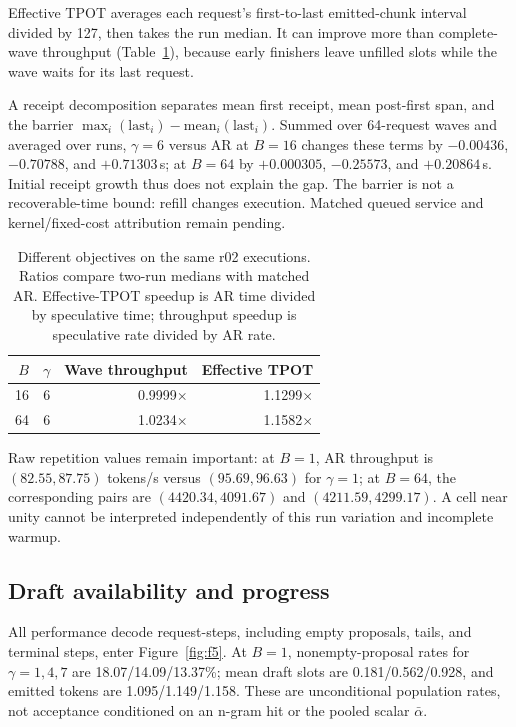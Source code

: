 \documentclass[conference,letterpaper]{IEEEtran}
\begin{document}
Effective TPOT averages each request's first-to-last emitted-chunk interval divided by 127, then takes the run median. It can improve more than complete-wave throughput (Table~\ref{tab:objectives}), because early finishers leave unfilled slots while the wave waits for its last request.

A receipt decomposition separates mean first receipt, mean post-first span, and the barrier $\max_i(\mathrm{last}_i)-\mathrm{mean}_i(\mathrm{last}_i)$. Summed over 64-request waves and averaged over runs, $\gamma=6$ versus AR at $B=16$ changes these terms by $-0.00436$, $-0.70788$, and $+0.71303$\,s; at $B=64$ by $+0.000305$, $-0.25573$, and $+0.20864$\,s. Initial receipt growth thus does not explain the gap. The barrier is not a recoverable-time bound: refill changes execution. Matched queued service and kernel/fixed-cost attribution remain pending.

\begin{table}[t]
\centering\small
\caption{Different objectives on the same r02 executions. Ratios compare two-run medians with matched AR. Effective-TPOT speedup is AR time divided by speculative time; throughput speedup is speculative rate divided by AR rate.}
\label{tab:objectives}
\begin{tabular}{@{}rrrr@{}}
\toprule
$B$ & $\gamma$ & Wave throughput & Effective TPOT \\\midrule
16 & 6 & 0.9999$\times$ & 1.1299$\times$ \\
64 & 6 & 1.0234$\times$ & 1.1582$\times$ \\
\bottomrule
\end{tabular}
\end{table}

Raw repetition values remain important: at $B=1$, AR throughput is $(82.55,87.75)$ tokens/s versus $(95.69,96.63)$ for $\gamma=1$; at $B=64$, the corresponding pairs are $(4420.34,4091.67)$ and $(4211.59,4299.17)$. A cell near unity cannot be interpreted independently of this run variation and incomplete warmup.

\subsection{Draft availability and progress}
All performance decode request-steps, including empty proposals, tails, and terminal steps, enter Figure~\ref{fig:f5}. At $B=1$, nonempty-proposal rates for $\gamma=1,4,7$ are 18.07/14.09/13.37\%; mean draft slots are 0.181/0.562/0.928, and emitted tokens are 1.095/1.149/1.158. These are unconditional population rates, not acceptance conditioned on an n-gram hit or the pooled scalar $\bar\alpha$.
\end{document}
